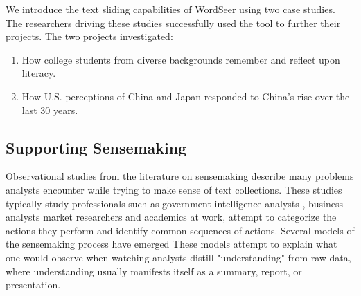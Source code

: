 \documentclass{sig-alternate}
\begin{document}
We introduce the text sliding capabilities of WordSeer using two case studies. The researchers driving these studies successfully used the tool to further their projects. The two projects investigated:
\begin{enumerate}
	\item How college students from diverse backgrounds remember and reflect upon literacy.
	\item How U.S. perceptions of China and Japan responded to China's rise over the last 30 years.
\end{enumerate}


\subsection{Supporting Sensemaking}

Observational studies from the literature on sensemaking describe many problems analysts encounter while trying to make sense of text collections. These studies typically study professionals such as government intelligence analysts \cite{x}, business analysts \cite{x} market researchers \cite{x} and academics \cite{x} at work, attempt to categorize the actions they perform and identify common sequences of actions. Several models of the sensemaking process have emerged \cite{x} These models attempt to explain what one would observe when watching analysts distill "understanding" from raw data, where understanding usually manifests itself as a summary, report, or presentation.
\end{document}
